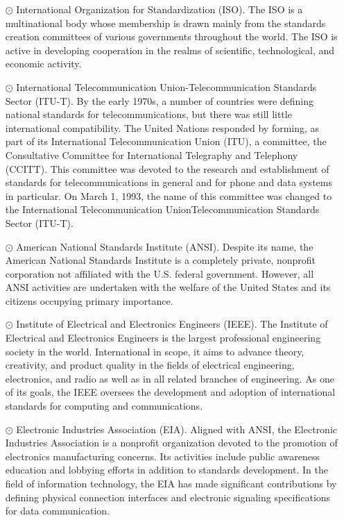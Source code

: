 \begin{itemize}
  \item[$\odot$] International Organization for Standardization (ISO). The ISO is a multinational body whose membership is drawn mainly from the standards creation committees of various governments throughout the world. The ISO is active in developing cooperation in the realms of scientific, technological, and economic activity. 
  \item[$\odot$] International Telecommunication Union-Telecommunication Standards Sector (ITU-T). By the early 1970s, a number of countries were defining national standards for telecommunications, but there was still little international compatibility. The United Nations responded by forming, as part of its International Telecommunication Union (ITU), a committee, the Consultative Committee for International Telegraphy and Telephony (CCITT). This committee was devoted to the research and establishment of standards for telecommunications in general and for phone and data systems in particular. On March 1, 1993, the name of this committee was changed to the International Telecommunication UnionTelecommunication Standards Sector (ITU-T). 
  \item[$\odot$] American National Standards Institute (ANSI). Despite its name, the American National Standards Institute is a completely private, nonprofit corporation not affiliated with the U.S. federal government. However, all ANSI activities are undertaken with the welfare of the United States and its citizens occupying primary importance. 
  \item[$\odot$] Institute of Electrical and Electronics Engineers (IEEE). The Institute of Electrical and Electronics Engineers is the largest professional engineering society in the world. International in scope, it aims to advance theory, creativity, and product quality in the fields of electrical engineering, electronics, and radio as well as in all related branches of engineering. As one of its goals, the IEEE oversees the development and adoption of international standards for computing and communications. 
  \item[$\odot$] Electronic Industries Association (EIA). Aligned with ANSI, the Electronic Industries Association is a nonprofit organization devoted to the promotion of electronics manufacturing concerns. Its activities include public awareness education and lobbying efforts in addition to standards development. In the field of information technology, the EIA has made significant contributions by defining physical connection interfaces and electronic signaling specifications for data communication.
\end{itemize}

